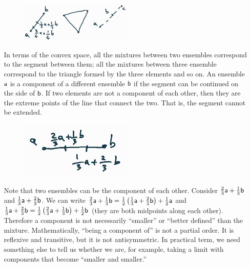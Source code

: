 \begin{figure}[h]
	\centering
	\includegraphics[width=0.5\textwidth]{tempimages/ConvexExamples.jpg}
\end{figure}

\begin{remark}
	In terms of the convex space, all the mixtures between two ensembles correspond to the segment between them; all the mixtures between three ensemble correspond to the triangle formed by the three elements and so on. An ensemble $\ens[a]$ is a component of a different ensemble $\ens[b]$ if the segment can be continued on the side of $\ens[b]$. If two elements are not a component of each other, then they are the extreme points of the line that connect the two. That is, the segment cannot be extended.
\end{remark}

\begin{figure}[h]
	\centering
	\includegraphics[width=0.5\textwidth]{tempimages/ComponentNotOrder.jpg}
\end{figure}

\begin{remark}
	Note that two ensembles can be the component of each other. Consider $\frac{2}{3} \ens[a] + \frac{1}{3} \ens[b]$ and $\frac{1}{3} \ens[a] + \frac{2}{3} \ens[b]$. We can write $\frac{2}{3} \ens[a] + \frac{1}{3} \ens[b] = \frac{1}{2}\left(\frac{1}{3} \ens[a] + \frac{2}{3} \ens[b]\right) + \frac{1}{2} \ens[a]$ and $\frac{1}{3} \ens[a] + \frac{2}{3} \ens[b] = \frac{1}{2}\left(\frac{2}{3} \ens[a] + \frac{1}{3} \ens[b]\right) + \frac{1}{2} \ens[b]$ (they are both midpoints along each other). Therefore a component is not necessarily ``smaller'' or ``better defined'' than the mixture. Mathematically, ``being a component of'' is not a partial order. It is reflexive and transitive, but it is not antisymmetric. In practical term, we need something else to tell us whether we are, for example, taking a limit with components that become ``smaller and smaller.''
\end{remark}

